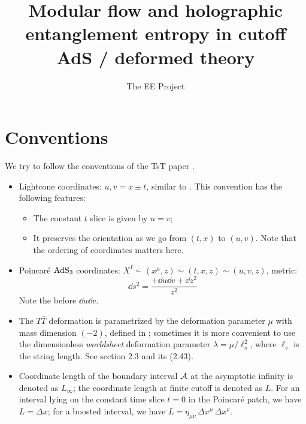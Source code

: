 \documentclass[11pt,a4paper]{article}
\title{Modular flow and holographic entanglement entropy in cutoff AdS / \TTbar deformed theory}
\author[a]{The EE \TTbar Project}
\affiliation[a]{Yau Mathematical Sciences Center, Tsinghua University, Beijing 100084, China}
\newcommand{\TTbar}{\ensuremath{T\bar{T}}\xspace}
\begin{document}
\maketitle

\setlength{\parskip}{.5\baselineskip}

\addtocounter{section}{-1}
\section{Conventions}
	We try to follow the conventions of the TsT paper \textcite{Apolo:2019zai}. 
	\begin{itemize}
	\item Lightcone coordinates: $u,v = x\pm t$, similar to \cite{Apolo:2019zai}. This convention has the following features:
	
		\begin{itemize}
		\item The constant $t$ slice is given by $u = v$;
		\item It preserves the orientation as we go from $(t,x)$ to $(u,v)$. Note that the ordering of coordinates matters here.
		\end{itemize}
	
	\item Poincar\'e $\mathrm{AdS}_3$ coordinates: $
			X^I \sim (x^\mu,z) \sim (t,x,z) \sim (u,v,z)
		$, metric: 
	\begin{equation}
		\dd{s}^2
		= \frac{+\dd{u} \dd{v} + \dd{z}^2}{z^2}
	\end{equation}
	Note the \mquote{+} before $\dd{u} \dd{v}$. 
	
	\item The \TTbar deformation is parametrized by the deformation parameter $\mu$ with mass dimension $(-2)$, defined in \cite{Apolo:2019zai}; sometimes it is more convenient to use the dimensionless \textit{worldsheet} deformation parameter $\lambda = \mu/\ell_s^2$, where $\ell_s$ is the string length. See \cite{Apolo:2019zai} section 2.3 and its (2.43). 
	
	\item Coordinate length of the boundary interval $\mathcal{A}$ at the asymptotic infinity is denoted as $L_\infty$; the coordinate length at finite cutoff is denoted as $L$. For an interval lying on the constant time slice $t = 0$ in the Poincar\'e patch, we have $L = \Delta x$; for a boosted interval, we have $
		L = \eta_{\mu\nu}\, \Delta x^\mu\, \Delta x^\nu
	$. 
	\end{itemize}
	
\end{document}

